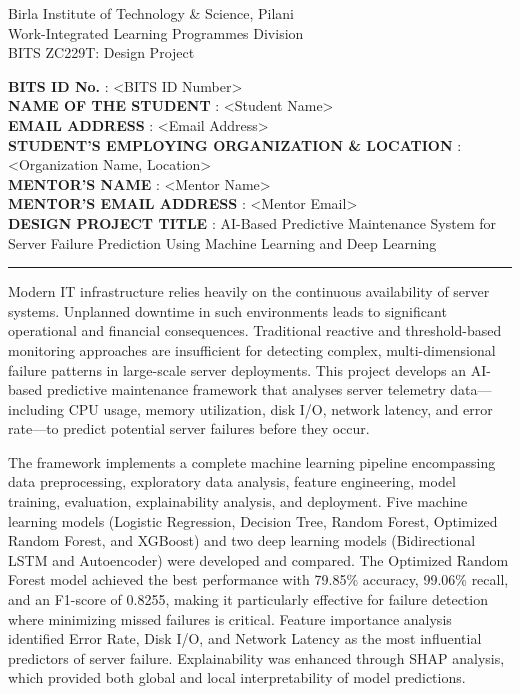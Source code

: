 \documentclass[12pt,letterpaper]{report}
\begin{document}
\begin{center}
{\small Birla Institute of Technology \& Science, Pilani}\\
{\small Work-Integrated Learning Programmes Division}\\[6pt]
{\small BITS ZC229T: Design Project}
\end{center}

\vspace{0.2in}

\noindent\textbf{BITS ID No.} : <BITS ID Number>\\
\textbf{NAME OF THE STUDENT} : <Student Name>\\
\textbf{EMAIL ADDRESS} : <Email Address>\\
\textbf{STUDENT'S EMPLOYING ORGANIZATION \& LOCATION} : <Organization Name, Location>\\
\textbf{MENTOR'S NAME} : <Mentor Name>\\
\textbf{MENTOR'S EMAIL ADDRESS} : <Mentor Email>\\
\textbf{DESIGN PROJECT TITLE} : AI-Based Predictive Maintenance System for Server Failure Prediction Using Machine Learning and Deep Learning

\vspace{0.2in}

\rule{\textwidth}{0.4pt}

\vspace{0.1in}

Modern IT infrastructure relies heavily on the continuous availability of server systems. Unplanned downtime in such environments leads to significant operational and financial consequences. Traditional reactive and threshold-based monitoring approaches are insufficient for detecting complex, multi-dimensional failure patterns in large-scale server deployments. This project develops an AI-based predictive maintenance framework that analyses server telemetry data---including CPU usage, memory utilization, disk I/O, network latency, and error rate---to predict potential server failures before they occur.

The framework implements a complete machine learning pipeline encompassing data preprocessing, exploratory data analysis, feature engineering, model training, evaluation, explainability analysis, and deployment. Five machine learning models (Logistic Regression, Decision Tree, Random Forest, Optimized Random Forest, and XGBoost) and two deep learning models (Bidirectional LSTM and Autoencoder) were developed and compared. The Optimized Random Forest model achieved the best performance with 79.85\% accuracy, 99.06\% recall, and an F1-score of 0.8255, making it particularly effective for failure detection where minimizing missed failures is critical. Feature importance analysis identified Error Rate, Disk I/O, and Network Latency as the most influential predictors of server failure. Explainability was enhanced through SHAP analysis, which provided both global and local interpretability of model predictions.
\end{document}
